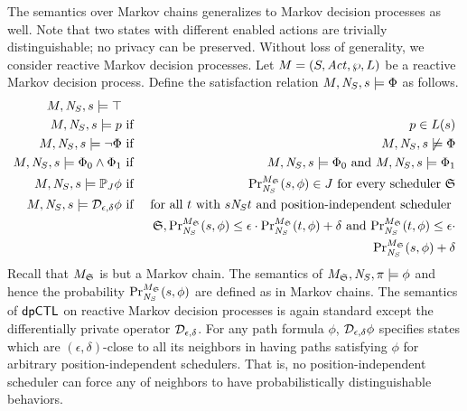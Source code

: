 The semantics over Markov chains generalizes to Markov decision
processes as well. Note that two states with different enabled actions
are trivially distinguishable; no privacy can be preserved. Without
loss of generality, we consider reactive Markov decision processes.
Let $M = (S, \Act, \wp, L)$ be a reactive Markov
decision process. Define the satisfaction
relation $M, \neighbor{S}, s \models \Phi$ as follows.
\begin{eqnarray*}
  M, \neighbor{S}, s \models \top\\
  M, \neighbor{S}, s \models p
  & \textmd{ if } &
  p \in L(s)\\
  M, \neighbor{S}, s \models \neg \Phi
  & \textmd{ if } &
  M, \neighbor{S}, s \not\models \Phi\\
  M, \neighbor{S}, s \models \Phi_0 \wedge \Phi_1
  & \textmd{ if } &
  M, \neighbor{S}, s \models \Phi_0 \textmd{ and }
  M, \neighbor{S}, s \models \Phi_1\\
  M, \neighbor{S}, s \models \PJ{J} \phi
  & \textmd{ if } &
  \myPr{s}{M_{\scheduler{S}}}{\neighbor{S}}{\phi} \in J  
  \textmd{ for every scheduler } \scheduler{S}\\
  M, \neighbor{S}, s \models \dpriv{\epsilon}{\delta} \phi
  & \textmd{ if } &
  \textmd{for all } t \textmd{ with } s \neighbor{S} t \textmd{ and
   position-independent scheduler } \\
  & & \scheduler{S}, 
   \myPr{s}{M_{\scheduler{S}}}{\neighbor{S}}{\phi} \leq \epsilon \cdot
   \myPr{t}{M_{\scheduler{S}}}{\neighbor{S}}{\phi} + \delta 
   \textmd{ and }
   \myPr{t}{M_{\scheduler{S}}}{\neighbor{S}}{\phi} \leq \epsilon \cdot
  \\
  & &
   \myPr{s}{M_{\scheduler{S}}}{\neighbor{S}}{\phi} + \delta
\end{eqnarray*}
Recall that $M_{\scheduler{S}}$ is but a Markov chain. The semantics
of $M_{\scheduler{S}}, \neighbor{S}, \pi \models \phi$ and hence the
probability $\myPr{s}{M_{\scheduler{S}}}{\neighbor{S}}{\phi}$ are
defined as in Markov chains. 
The semantics of $\dpCTL$ on reactive Markov decision processes
is again standard except the differentially private operator
$\dpriv{\epsilon}{\delta}$. For any path formula $\phi$,
$\dpriv{\epsilon}{\delta} \phi$ specifies states which are $(\epsilon,
\delta)$-close to all its neighbors in having paths satisfying $\phi$
for arbitrary position-independent schedulers. That is, no
position-independent scheduler can force any of neighbors to have
probabilistically distinguishable behaviors. 


